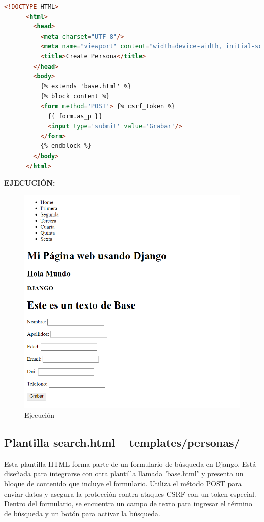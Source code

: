 \documentclass{article}
\begin{document}
    \begin{lstlisting}[language=html]
      <!DOCTYPE HTML>
      <html>
        <head>
          <meta charset="UTF-8"/>
          <meta name="viewport" content="width=device-width, initial-scale=1.0"/>
          <title>Create Persona</title>
        </head>
        <body>
          {% extends 'base.html' %}
          {% block content %}
          <form method='POST'> {% csrf_token %}
            {{ form.as_p }}
            <input type='submit' value='Grabar'/>
          </form>
          {% endblock %}
        </body>
      </html>
    \end{lstlisting}
    \textbf{EJECUCIÓN: }
    \begin{figure}[H]
      \centering
      \includegraphics[width=1\textwidth, keepaspectratio]{img/ejecucion3.png}
      \caption{Ejecución}
    \end{figure}


  \subsection{Plantilla search.html -- templates/personas/}
    Esta plantilla HTML forma parte de un formulario de búsqueda en Django. Está diseñada para integrarse con otra 
    plantilla llamada 'base.html' y presenta un bloque de contenido que incluye el formulario. Utiliza el método 
    POST para enviar datos y asegura la protección contra ataques CSRF con un token especial. Dentro del formulario, 
    se encuentra un campo de texto para ingresar el término de búsqueda y un botón para activar la búsqueda.
\end{document}
